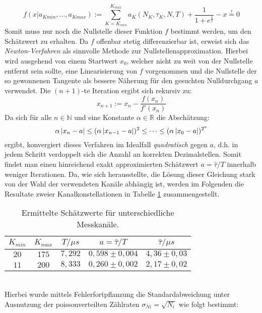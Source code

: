 		\begin{equation} \label{eq:mastereq}
					f(x|a_{Kmin},\dots,a_{Kmax}) := \sum_{K = K_{min}}^{K_{max}} a_K(N_K,\tau_K,N,T) + \frac{1}{1 + e^{\frac{1}{x}}} - x \overset{!}{=} 0  
		\end{equation}
	Somit muss nur noch die Nullstelle dieser Funktion $f$ bestimmt werden, um den Schätzwert zu erhalten. Da $f$ offenbar stetig differenzierbar ist, erweist sich das \textit{Newton-Verfahren} als sinnvolle Methode zur Nullstellenapproximation. Hierbei wird ausgehend von einem Startwert $x_0$, welcher nicht zu weit von der Nullstelle entfernt sein sollte, eine Linearisierung von $f$ vorgenommen und die Nullstelle der so gewonnenen Tangente als bessere Näherung für den gesuchten Nulldurchgang $a$ verwendet. Die $(n+1)$-te Iteration ergibt sich rekursiv zu:
		\begin{equation} 
			x_{n+1} := x_n - \frac{f(x_n)}{f'(x_n)}
		\end{equation}
	Da sich für alle $n\in \mathbb{N}$ und eine Konstante $\alpha\in \mathbb{R}$ die Abschätzung:
		 \begin{equation} 
		 			\alpha \left\vert x_{n}-a\right\vert\leq (\alpha \left\vert x_{n-1}-a\right\vert)^2\leq \dots \leq (\alpha\left\vert x_0-a\right\vert)^{2^n}
		 \end{equation}
	ergibt, konvergiert dieses Verfahren im Idealfall \textit{quadratisch} gegen $a$, d.h. in jedem Schritt verdoppelt sich die Anzahl an korrekten Dezimalstellen. Somit findet man einen hinreichend exakt approximierten Schätzwert $a = \hat{\tau}/T$ innerhalb weniger Iterationen. Da, wie sich herausstellte, die Lösung dieser Gleichung stark von der Wahl der verwendeten Kanäle abhängig ist, werden im Folgenden die Resultate zweier Kanalkonstellationen in Tabelle \ref{table:resExp}  zusammengestellt.\\
		\begin{table}[hp]
			\centering
			\begin{tabular}{c|c|c|c|c} 
				$K_{min}$		&		$K_{max}$		&		$T/\mu s$		&		$a = \hat{\tau}/T$		&		$\hat{\tau}/\mu s$\\
				\hline
				$20$			&		$175$			&		$7,292$			&		$0,598 \pm 0,004$		&		$4,36 \pm 0,03$\\	
				$11$			&		$200$			&		$8,333$			&		$0,260 \pm 0,002$		&		$2,17 \pm 0,02$		
			\end{tabular}
			\caption{Ermittelte Schätzwerte für unterschiedliche Messkanäle.}
			\label{table:resExp} 
		\end{table}
	\ \\
	Hierbei wurde mittels Fehlerfortpflanzung die Standardabweichung unter Ausnutzung der poissonverteilten Zählraten $\sigma_{Ni} = \sqrt{N_i}$ wie folgt bestimmt:
